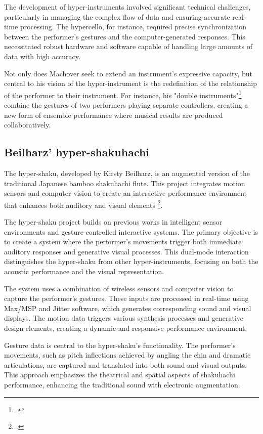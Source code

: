 \documentclass[12pt,twoside,maitrise]{dms_ks}
\theoremstyle{definition}
\begin{document}
The development of hyper-instruments involved significant technical challenges, particularly in managing the complex flow of data and ensuring accurate real-time processing. 
The hypercello, for instance, required precise synchronization between the performer's gestures and the computer-generated responses. 
This necessitated robust hardware and software capable of handling large amounts of data with high accuracy.

Not only does Machover seek to extend an instrument's expressive capacity, but central to his vision of the hyper-instrument is the redefinition of the relationship of the performer to their instrument. 
For instance, his "double instruments"\footcite[189]{machover_hyper-instruments_1989} combine the gestures of two performers playing separate controllers, creating a new form of ensemble performance where musical results are produced collaboratively.

\subsection{Beilharz' hyper-shakuhachi}

The hyper-shaku, developed by Kirsty Beilharz, is an augmented version of the traditional Japanese bamboo shakuhachi flute. 
This project integrates motion sensors and computer vision to create an interactive performance environment that enhances both auditory and visual elements \footcite{beilharz_hyper-shaku_2006}. 

The hyper-shaku project builds on previous works in intelligent sensor environments and gesture-controlled interactive systems. 
The primary objective is to create a system where the performer's movements trigger both immediate auditory responses and generative visual processes. 
This dual-mode interaction distinguishes the hyper-shaku from other hyper-instruments, focusing on both the acoustic performance and the visual representation.

The system uses a combination of wireless sensors and computer vision to capture the performer's gestures. 
These inputs are processed in real-time using Max/MSP and Jitter software, which generates corresponding sound and visual displays. 
The motion data triggers various synthesis processes and generative design elements, creating a dynamic and responsive performance environment.

Gesture data is central to the hyper-shaku's functionality. 
The performer's movements, such as pitch inflections achieved by angling the chin and dramatic articulations, are captured and translated into both sound and visual outputs. 
This approach emphasizes the theatrical and spatial aspects of shakuhachi performance, enhancing the traditional sound with electronic augmentation.
\end{document}
